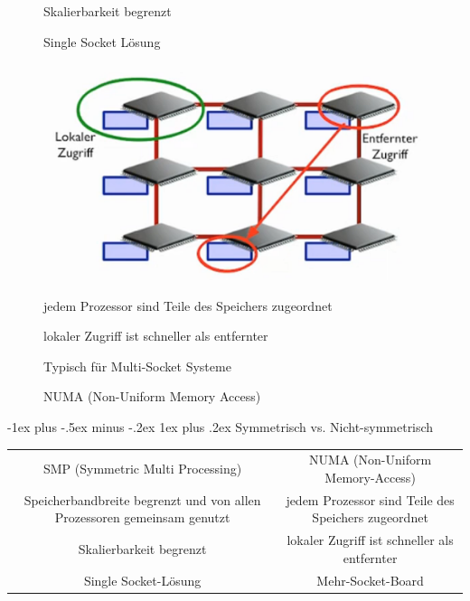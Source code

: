 \documentclass[10pt]{article}
\makeatletter
\renewcommand{\subsubsection}{\@startsection{subsubsection}{3}{0mm}%
                                {-1ex plus -.5ex minus -.2ex}%
                                {1ex plus .2ex}%
                                {\normalfont\small\bfseries}}
\makeatother
\begin{document}
\begin{figure}[!tbp]
\begin{minipage}[b]{0.45\textwidth}
\begin{itemize*}
        \item Skalierbarkeit begrenzt
        \item Single Socket Lösung
      \end{itemize*}
    \end{minipage}
    \hfill
    \begin{minipage}[b]{0.45\textwidth}
      \includegraphics[width=1.0\linewidth]{Assets/Programmierparadigmen-NUMA}
      \caption{NUMA (Non-Uniform Memory Access)}
      \begin{itemize*}
        \item jedem Prozessor sind Teile des Speichers zugeordnet
        \item lokaler Zugriff ist schneller als entfernter
        \item Typisch für Multi-Socket Systeme
      \end{itemize*}
    \end{minipage}
  \end{figure}
  
  \subsubsection{Symmetrisch vs. Nicht-symmetrisch}
  \begin{tabular}{c | c}
    SMP (Symmetric Multi Processing)                                        & NUMA (Non-Uniform Memory-Access)                    \\
    Speicherbandbreite begrenzt und von allen Prozessoren gemeinsam genutzt & jedem Prozessor sind Teile des Speichers zugeordnet \\
    Skalierbarkeit begrenzt                                                 & lokaler Zugriff ist schneller als entfernter        \\
    Single Socket-Lösung                                                    & Mehr-Socket-Board                                   \\
  \end{tabular}
  
\end{document}
